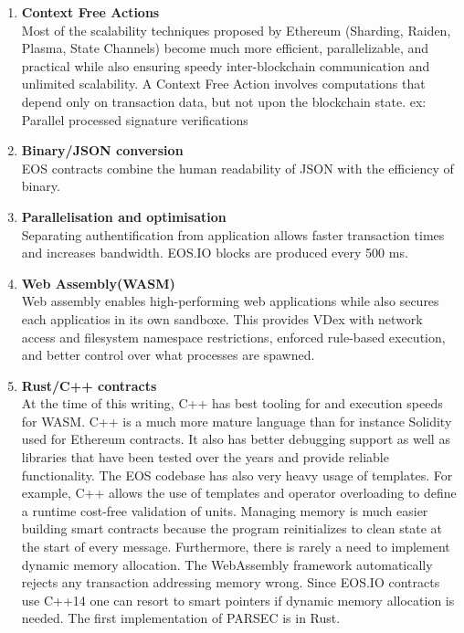 \documentclass[]{article}
\begin{document}
{	\begin{enumerate}
					
			\item \textbf{Context Free Actions} \\
		Most of the scalability techniques proposed by Ethereum (Sharding, Raiden, Plasma, State Channels) 
		become much more efficient, parallelizable, and practical while also ensuring speedy inter-blockchain communication and unlimited scalability.
		A Context Free Action involves computations that depend only on transaction data, but not upon the blockchain state.
		ex: Parallel processed signature verifications\\
		
		\item\textbf{ Binary/JSON conversion} \\
		 EOS contracts combine the human readability of JSON with the efficiency of binary. \\
	
		\item \textbf{Parallelisation and optimisation\\ } 
		Separating authentification from application allows faster transaction times and increases bandwidth.
		EOS.IO blocks are produced every 500 ms.
		
	\item \textbf{Web Assembly(WASM)}   \\
	Web assembly enables high-performing web applications while also secures each applicatios in its own sandboxe.
	This provides VDex with network access and filesystem namespace restrictions, enforced rule-based execution, and better control over what processes are spawned.
	
	\item \textbf{Rust/C++ contracts\\}
	At the time of this writing,
	C++ has best tooling for and execution speeds for WASM.
	C++ is a much more mature language than for instance Solidity used for Ethereum contracts.
	It also has better debugging support as well as libraries that have been tested over the years and provide reliable functionality. 
	The EOS codebase has also very heavy usage of templates.
	For example, C++ allows the use of templates and operator overloading to define a runtime cost-free validation of units.
	Managing memory is much easier building smart contracts because the
	program reinitializes to clean state at the start of every message. Furthermore, there is rarely a need to implement dynamic memory allocation. 
	The WebAssembly framework automatically rejects any transaction addressing memory wrong.
	Since EOS.IO contracts use C++14 one can resort to smart pointers if dynamic memory allocation is needed.
	The first implementation of PARSEC is in Rust.\cite{23}
	 	

\end{enumerate}}
\end{document}
